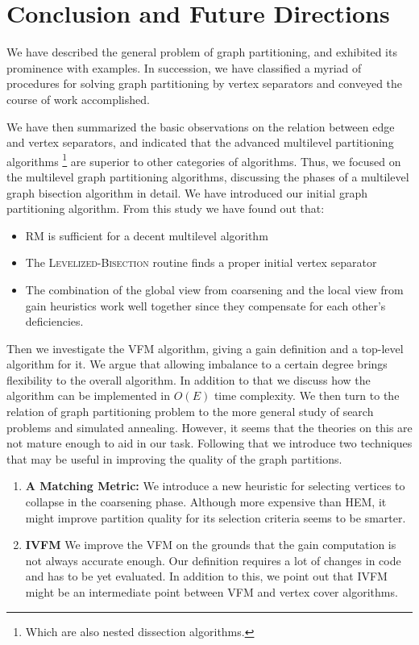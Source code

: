 \documentclass[a4paper,12pt]{article}
\begin{document}
\section{Conclusion and Future Directions}



We have described the general problem of graph partitioning, and
exhibited its prominence with examples. In succession, we have classified
a myriad of procedures for solving graph partitioning by vertex
separators and conveyed the course of work accomplished.

We have then summarized the basic observations on the relation between
edge and vertex separators, and indicated that the advanced
multilevel partitioning algorithms \footnote{Which are also nested
dissection algorithms.} are superior to other categories of
algorithms.
Thus, we focused on the multilevel graph partitioning algorithms,
discussing the phases of a multilevel graph bisection algorithm in
detail. We have introduced our initial graph partitioning algorithm.
From this study we have found out that:
\begin{itemize}
\item RM is sufficient for a decent multilevel algorithm
\item The \textsc{Levelized-Bisection} routine finds a proper initial
vertex separator
\item The combination of the global view from coarsening and the local
view from gain heuristics work well together since they compensate for
each other's deficiencies.
\end{itemize}
Then we investigate the VFM algorithm, giving a gain definition and a
top-level algorithm for it. We argue that allowing imbalance to a
certain degree brings flexibility to the overall algorithm. In
addition to that we discuss how the algorithm can be implemented in
$O(E)$ time complexity.
We then turn to the relation of graph partitioning problem to the more
general study of search problems and simulated annealing. However, it
seems that the theories on this are not mature enough to aid in
our task.
Following that we introduce two techniques that may be useful in
improving the quality of the graph partitions.
\begin{enumerate}
\item \textbf{A Matching Metric:} We introduce a new heuristic for
selecting vertices to collapse in the coarsening phase. Although more
expensive than HEM, it might improve partition quality for its
selection criteria seems to be smarter.
\item \textbf{IVFM} We improve the VFM on the grounds that the
gain computation is not always accurate enough. Our definition
requires a lot of changes in code and has to be yet evaluated. In
addition to this, we point out that IVFM might be an intermediate
point between VFM and vertex cover algorithms.
\end{enumerate}
\end{document}
